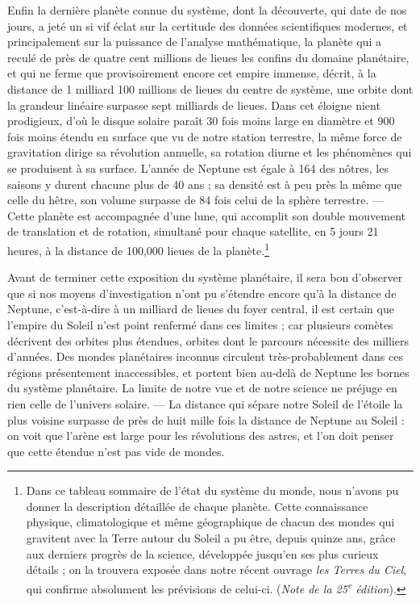 \documentclass[a4paper, 11pt, oneside, landscape]{article}
\begin{document}
Enfin la dernière planète connue du système, dont la découverte, qui date de nos jours, a jeté un si vif éclat sur la certitude des données scientifiques modernes, et principalement sur la puissance de l'analyse mathématique, la planète qui a reculé de près de quatre cent millions de lieues les confins du domaine planétaire, et qui ne ferme que provisoirement encore cet empire immense, décrit, à la distance de 1 milliard 100 millions de lieues du centre de système, une orbite dont la grandeur linéaire surpasse sept milliards de lieues. Dans cet éloigne nient prodigieux, d'où le disque solaire paraît 30 fois moins large en diamètre et 900 fois moins étendu en surface que vu de notre station terrestre, la même force de gravitation dirige sa révolution annuelle, sa rotation diurne et les phénomènes qui se produisent à sa surface. L'année de Neptune est égale à 164 des nôtres, les saisons y durent chacune plus de 40 ans ; sa densité est à peu près la même que celle du hêtre, son volume surpasse de 84 fois celui de la sphère terrestre. --- Cette planète est accompagnée d'une lune, qui accomplit son double mouvement de translation et de rotation, simultané pour chaque satellite, en 5 jours 21 heures, à la distance de 100,000 lieues de la planète.\footnote{Dans ce tableau sommaire de l'état du système du monde, nous n'avons pu donner la description détaillée de chaque planète. Cette connaissance physique, climatologique et même géographique de chacun des mondes qui gravitent avec la Terre autour du Soleil a pu être, depuis quinze ans, grâce aux derniers progrès de la science, développée jusqu'en ses plus curieux détails ; on la trouvera exposée dans notre récent ouvrage \emph{les Terres du Ciel}, qui confirme absolument les prévisions de celui-ci. (\emph{Note de la 25\textsuperscript{e} édition}).}

Avant de terminer cette exposition du système planétaire, il sera bon d'observer que si nos moyens d'investigation n'ont pu s'étendre encore qu'à la distance de Neptune, c'est-à-dire à un milliard de lieues du foyer central, il est certain que l'empire du Soleil n'est 
point renfermé dans ces limites ; car plusieurs comètes décrivent des orbites plus étendues, orbites dont le parcours nécessite des milliers d'années. Des mondes planétaires inconnus circulent très-probablement dans ces régions présentement inaccessibles, et portent bien au-delà de Neptune les bornes du système planétaire. La limite de notre vue et de notre science ne préjuge en rien celle de l'univers solaire. --- La distance qui sépare notre Soleil de l'étoile la plus voisine surpasse de près de huit mille fois la distance de Neptune au Soleil : on voit que l'arène est large pour les révolutions des astres, et l'on doit penser que cette étendue n'est pas vide de mondes.
\end{document}
